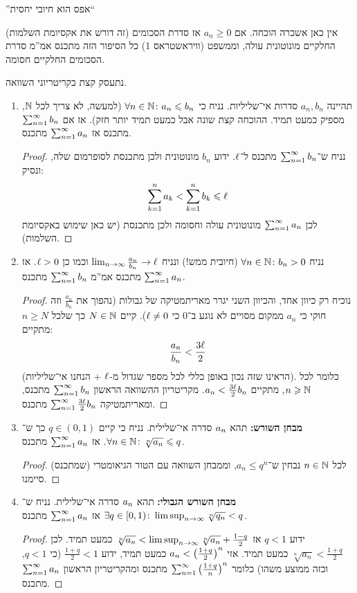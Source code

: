 \documentclass[name=רשימות חשבון דיפרנציאלי ואינטגרלי 1א]{../../../tex/classes/megasumPreamble}
\begin{document}
	''אפס הוא חיובי יחסית``

	(זה דורש את אקסיומת השלמות) אין כאן אשכרה הוכחה. אם $a_n \ge 0$ אז סדרת הסכומים החלקיים מונוטונית עולה, וממשפט (וויראשטראס 1) כל הסיפור הזה מתכנס אמ''מ סדרת הסכומים החלקיים חסומה.

	נתעסק קצת בקריטריוני השוואה.
	\begin{enumerate}
		\item תהיינה $a_n, b_n$ סדרות אי־שליליות. נניח כי $\forall n \in \mathbb{N} \colon a_n \leqslant b_n$ (למעשה, לא צריך לכל $\mathbb{N}$, מספיק כמעט תמיד. ההוכחה קצת שונה אבל כמעט תמיד יותר חזק). אז אם $\sum_{n = 1}^{\infty} b_n$ מתכנס אז $\sum_{n = 1}^{\infty} a_n$ מתכנס.
		\begin{proof}
			נניח ש־$\sum_{n = 1}^{\infty} b_n$ מתכנס ל־$\ell$. ידוע $b_n$ מונוטונית ולכן מתכנסת לסופרמום שלה, ונסיק:
			\[ \sum_{k = 1}^{n} a_k < \sum_{k = 1}^{n} b_k \leqslant \ell \]
			לכן $\sum_{n = 1}^{\infty} a_n$ מונוטונית עולה וחסומה ולכן מתכנסת (יש כאן שימוש באקסיומת השלמות).
		\end{proof}
		\item נניח $\forall n \in \mathbb{N}\colon b_n > 0$ (חיובית ממש!) ונניח $\lim_{n \to \infty} \frac{a_n}{b_n} \to \ell$ וכמו כן $\ell > 0$. אז $\sum_{n = 1}^{\infty} a_n$ מתכנס אמ''מ $\sum_{n = 1}^{\infty} b_n$ מתכנס. \begin{proof}
			נוכיח רק כיוון אחד, והכיוון השני יגרר מאריתמטיקה של גבולות (נהפוך את $\frac{a_n}{b_n}$ וזה חוקי כי $a_n$ ממקום מסויים לא נוגע ב־$0$ כי $\ell \neq 0$). קיים $N \in \mathbb{N}$ כך שלכל $n \ge N$ מתקיים:
			\[ \frac{a_n}{b_n} < \frac{3\ell}{2} \]
			(הראינו שזה נכון באופן כללי לכל מספר שגדול מ-$\ell$ + הנחנו אי־שליליות). כלומר לכל $n \geqslant \mathbb{N}$, מתקיים $a_n < \frac{3\ell}{2}b_n$. מקריטריון ההשוואה הראשון $\sum_{n = 1}^{\infty} b_n$ מתכנס, ומאריתמטיקה $\sum_{n = 1}^{\infty} \frac{3\ell}{2}b_n$ מתכנס.
		\end{proof}
		\item \textbf{מבחן השורש: }תהא $a_n$ סדרה אי־שלילית. נניח כי קיים $q \in (0, 1)$ כך ש־$\forall n \in \mathbb{N} \colon \sqrt[n]{a_n} \leqslant q$. אז $\sum_{n = 1}^{\infty} a_n$ מתכנס.
		\begin{proof}
			לכל $n \in \mathbb{N}$ נבחין ש־$a_n \le q^{n}$, וממבחן השוואה עם הטור הגיאומטרי (שמתכנס) סיימנו.
		\end{proof}
		\item \textbf{מבחן השורש הגבולי: }תהא $a_n$ סדרה אי־שלילית. נניח ש־$\exists q \in [0, 1) \colon \limsup_{n \to \infty} \sqrt[n]{q_n} < q$ אז $\sum_{n = 1}^{\infty} a_n$ מתכנס.
		\begin{proof}ידוע $q < 1$ אז $\sqrt[n]{a_n} < \limsup_{n \to \infty} \sqrt[n]{a_n} + \frac{1 - q}{2}$ כמעט תמיד. לכן $\sqrt[n]{a_n} < \frac{1 + q}{2}$ כמעט תמיד. אזי $a_n < \left ( \frac{1 + q}{2} \right )^{n}$ כמעט תמיד, ידוע $\frac{1 + q}{2} < 1$ (כי $q < 1$, וכזה ממוצע משהו) כלומר $\sum_{n = 1}^{\infty} \left ( \frac{1 + q}{n} \right )^{n}$ מתכנס ומהקריטריון הראשון $\sum_{n = 1}^{\infty} a_n$ מתכנס.

\end{proof}
\end{enumerate}
\end{document}
